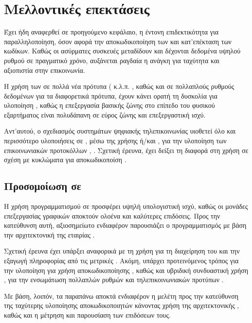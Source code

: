 \chapter{Mελλοντικές επεκτάσεις}
Έχει ήδη αναφερθεί σε προηγούμενο κεφάλαιο, η έντονη επιδεκτικότητα για παραλληλοποίηση, όσον αφορά την αποκωδικοποίηση των  και κατ'επέκταση των  κωδίκων. Καθώς οι ασύρματες συσκευές μεταδίδουν και δέχονται δεδομένα υψηλού ρυθμού σε πραγματικό χρόνο, αυξάνεται ραγδαία η ανάγκη για ταχύτητα και αξιοπιστία στην επικοινωνία.

Η χρήση των  σε πολλά νέα πρότυπα (  κ.λ.π. \cite{falcao2011massively}, καθώς και σε πολλαπλούς ρυθμούς δεδομένων για τα διαφορετικά πρότυπα, έχουν κάνει ορατή τη δυσκολία για υλοποίηση , καθώς η επεξεργασία βασικής ζώνης στο επίπεδο του φυσικού εξαρτήματος είναι πολυδάπανη σε εύρος ζώνης και επεξεργαστική ισχύ. 

Αντ'αυτού, ο σχεδιασμός συστημάτων ψηφιακής τηλεπικοινωνίας υιοθετεί όλο και περισσότερο υλοποιήσεις σε , μέσω της χρήσης  ή/και , για την υλοποίηση των επικοινωνιακών προτοκόλλων \cite{park2011parallel}, \cite{abburi2011scalable}. Σχετική έρευνα, έχει δείξει τη διαφορά στη χρήση  σε σχέση με κυκλώματα  για  αποκωδικοποίση \cite{falcao2009gpus}.

\section{Προσομοίωση σε }

Η χρήση προγραμματισμού σε  προσφέρει υψηλή υπολογιστική ισχύ, καθώς οι μονάδες επεξεργασίας γραφικών αποκτούν ολοένα και καλύτερες επιδόσεις. Προς την κατεύθυνση αυτή, αξιοσημείωτο ενδιαφέρον παρουσιάζει ο προγραμματισμός με βάση την αρχιτεκτονική  της εταιρίας .

Σχετική έρευνα έχει υπάρξει αναφορικά με τη χρήση  για τη διαχείρηση του  και την εξαγωγή πληροφορίας από τις μετρικές  \cite{falcao2009parallel}. Ακόμη, υπάρχει προτεινόμενος τρόπος για την υλοποίηση  για χρήση  αποκωδικοποίησης \cite{falcao2011massively}, καθώς και υβριδική συνδυαστική χρήση , για την ενσωμάτωση πολλαπλών ρυθμών και τηλεπικοινωνιακών προτύπων \cite{park2011parallel}.

Με βάση, λοιπόν, τα παραπάνω αποκτά ενδιαφέρον η μελέτη προς την κατεύθυνση της ταχύτερης υλοποίησης  αποκωδικοποιητών κάνοντας χρήση της αρχιτεκτονικής , καθώς και η μέτρηση και παρουσίαση των επιδόσεων τους.